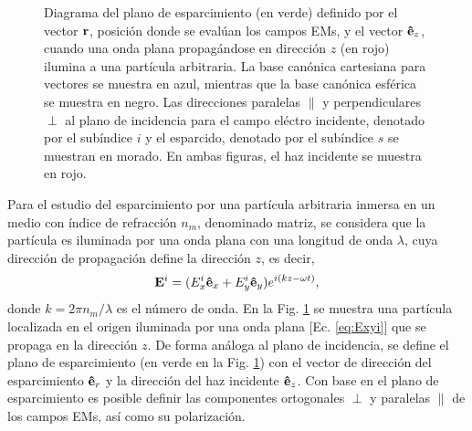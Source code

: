 \begin{figure}[b!]
%
\caption{Diagrama del plano de esparcimiento (en verde) definido por el vector $\vb{r}$, posición donde se evalúan los campos EMs, y el vector $\vu{e}_z$, cuando una onda plana propagándose en dirección $z$ (en rojo) ilumina a una partícula arbitraria.  La base canónica cartesiana para vectores se muestra en azul, mientras que la base canónica esférica se muestra en negro.  Las direcciones paralelas $\parallel$ y perpendiculares $\perp$ al plano de incidencia  para el campo eléctro incidente, denotado por el subíndice $i$ y el esparcido, denotado por el subíndice $s$ se muestran en morado.  En ambas figuras, el haz incidente se muestra en rojo.}\label{fig:PlanoEsparcimiento}
	\end{figure}	

Para el estudio del esparcimiento por una partícula arbitraria inmersa en un medio con índice de refracción $n_m$, denominado  matriz, se considera que la partícula es iluminada por una onda plana con una longitud de onda $\lambda$, cuya dirección de propagación define la dirección $z$, es decir,
	\begin{align}
	\vb{E}^i = (E_x^i \vu{e}_x + E_y^i \vu{e}_y)e^{i(k z - \omega t)},
	\label{eq:Exyi}
	\end{align}
donde $k = 2\pi n_m /\lambda$ es el número de onda. En la Fig.  \ref{fig:PlanoEsparcimiento} se muestra  una partícula localizada en el origen iluminada por una onda plana [Ec. \eqref{eq:Exyi}] que se propaga en la dirección $z$.  De forma análoga al plano de incidencia, se define el plano de esparcimiento (en verde en la Fig. \ref{fig:PlanoEsparcimiento}) con el vector de dirección del esparcimiento $\vu{e}_r$ y la dirección del haz incidente $\vu{e}_z$. Con base en el plano de esparcimiento es posible definir las componentes ortogonales $\perp$ y paralelas $\parallel$ de los campos EMs, así como su polarización.  

